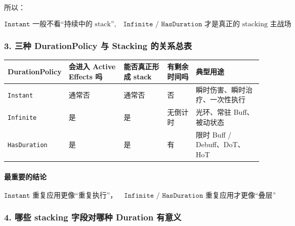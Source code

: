 \documentclass[CJKmath=true,10pt]{MyBook}
\begin{document}
所以：

\[
\boxed{
	\texttt{Instant} \text{ 一般不看“持续中的 stack”} ,
	\quad
	\texttt{Infinite / HasDuration} \text{ 才是真正的 stacking 主战场}
}
\]

\subsubsection{3. 三种 DurationPolicy 与 Stacking 的关系总表}

\begin{longtable}{@{}p{}p{}p{}p{}p{}@{}}
	\toprule
	\textbf{DurationPolicy} &
	\textbf{会进入 Active Effects 吗} &
	\textbf{能否真正形成 stack} &
	\textbf{有剩余时间吗} &
	\textbf{典型用途} \\
	\midrule
	\endhead
	
	\texttt{Instant}
	&
	通常否
	&
	通常否
	&
	否
	&
	瞬时伤害、瞬时治疗、一次性执行
	\\
	
	\texttt{Infinite}
	&
	是
	&
	是
	&
	无倒计时
	&
	光环、常驻 Buff、被动状态
	\\
	
	\texttt{HasDuration}
	&
	是
	&
	是
	&
	有
	&
	限时 Buff / Debuff、DoT、HoT
	\\
	
	\bottomrule
\end{longtable}

\paragraph{最重要的结论}
\[
\boxed{
	\texttt{Instant} \text{ 重复应用更像“重复执行”}，
	\quad
	\texttt{Infinite / HasDuration} \text{ 重复应用才更像“叠层”}
}
\]

\subsubsection{4. 哪些 stacking 字段对哪种 Duration 有意义}
\end{document}
